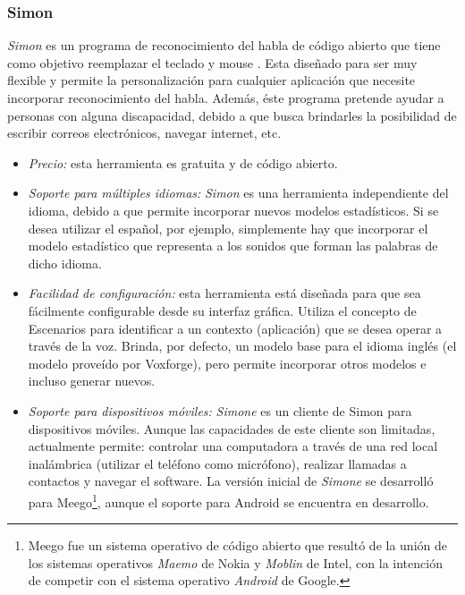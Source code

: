 \subsubsection{Simon}
\label{sec:simon}

\emph{Simon} es un programa de reconocimiento del habla de c\'odigo abierto que tiene como objetivo
reemplazar el teclado y mouse \cite{SimonListen}. Esta dise\~nado para ser muy flexible y permite la
personalizaci\'on para cualquier aplicaci\'on que necesite incorporar reconocimiento
del habla. Adem\'as, \'este programa pretende ayudar a personas con alguna discapacidad, debido
a que busca brindarles la posibilidad de escribir correos electr\'onicos, navegar internet, etc.

\begin{itemize}
    \item \emph{Precio:} esta herramienta es gratuita y de c\'odigo abierto.
    \item \emph{Soporte para m\'ultiples idiomas:} \emph{Simon} es una herramienta independiente del idioma,
    debido a que permite incorporar nuevos modelos estad\'isticos. Si se desea
	utilizar el espa\~nol, por ejemplo, simplemente hay que incorporar el modelo estad\'istico que representa
    a los sonidos que forman las palabras de dicho idioma.
    \item \emph{Facilidad de configuraci\'on:} esta herramienta est\'a dise\~nada para que sea
	f\'acilmente configurable desde su interfaz gr\'afica. Utiliza el concepto de Escenarios para identificar a un contexto (aplicaci\'on)
	que se desea operar a trav\'es de la voz. Brinda, por defecto, un modelo base para el idioma ingl\'es (el
    modelo prove\'ido por Voxforge\cite{Voxforge}), pero permite incorporar otros modelos e incluso generar nuevos.
    \item \emph{Soporte para dispositivos m\'oviles:} \emph{Simone} es un cliente de Simon para dispositivos m\'oviles. Aunque las
	capacidades de este cliente son limitadas, actualmente permite: controlar una computadora a trav\'es de una red
	local inal\'ambrica (utilizar el tel\'efono como micr\'ofono), realizar llamadas a contactos y navegar el software. 
    La versi\'on inicial de \emph{Simone} se desarroll\'o para 
	Meego\footnote{Meego fue un sistema operativo de c\'odigo abierto que result\'o de la uni\'on de
	los sistemas operativos \emph{Maemo} de Nokia y \emph{Moblin} de Intel, con la intenci\'on de competir
	con el sistema operativo \emph{Android} de Google.}, aunque el soporte para Android se encuentra en desarrollo.

\end{itemize}
